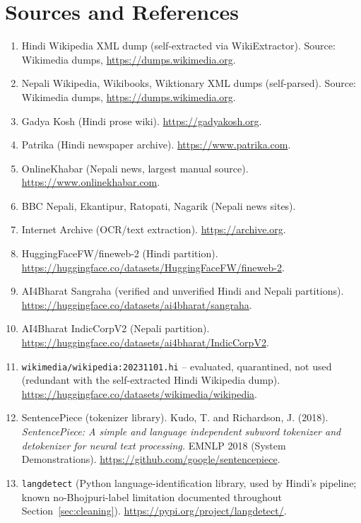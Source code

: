 \documentclass[11pt]{article}
\begin{document}
\section*{Sources and References}

\begin{enumerate}
\item Hindi Wikipedia XML dump (self-extracted via WikiExtractor).
Source: Wikimedia dumps, \url{https://dumps.wikimedia.org}.
\item Nepali Wikipedia, Wikibooks, Wiktionary XML dumps (self-parsed).
Source: Wikimedia dumps, \url{https://dumps.wikimedia.org}.
\item Gadya Kosh (Hindi prose wiki). \url{https://gadyakosh.org}.
\item Patrika (Hindi newspaper archive). \url{https://www.patrika.com}.
\item OnlineKhabar (Nepali news, largest manual source).
\url{https://www.onlinekhabar.com}.
\item BBC Nepali, Ekantipur, Ratopati, Nagarik (Nepali news sites).
\item Internet Archive (OCR/text extraction). \url{https://archive.org}.
\item HuggingFaceFW/fineweb-2 (Hindi partition).
\url{https://huggingface.co/datasets/HuggingFaceFW/fineweb-2}.
\item AI4Bharat Sangraha (verified and unverified Hindi and Nepali
partitions). \url{https://huggingface.co/datasets/ai4bharat/sangraha}.
\item AI4Bharat IndicCorpV2 (Nepali partition).
\url{https://huggingface.co/datasets/ai4bharat/IndicCorpV2}.
\item \texttt{wikimedia/wikipedia:20231101.hi} -- evaluated, quarantined,
not used (redundant with the self-extracted Hindi Wikipedia dump).
\url{https://huggingface.co/datasets/wikimedia/wikipedia}.
\item SentencePiece (tokenizer library). Kudo, T. and Richardson, J.
(2018). \textit{SentencePiece: A simple and language independent subword
tokenizer and detokenizer for neural text processing.} EMNLP 2018 (System
Demonstrations). \url{https://github.com/google/sentencepiece}.
\item \texttt{langdetect} (Python language-identification library, used
by Hindi's pipeline; known no-Bhojpuri-label limitation documented
throughout Section~\ref{sec:cleaning}).
\url{https://pypi.org/project/langdetect/}.
\end{enumerate}
\end{document}
